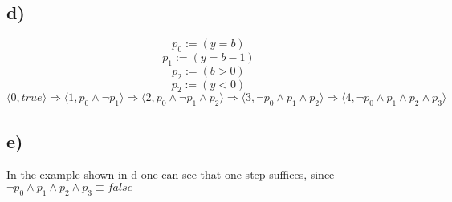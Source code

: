 \documentclass[fleqn,12pt]{article}
\begin{document}
\subsection*{d)}
$$p_0 := (y = b)$$
$$p_1 := (y = b - 1)$$
$$p_2 := (b>0)$$
$$p_2 := (y<0)$$
$$\langle 0, true \rangle \Rightarrow \langle 1, p_0 \wedge \lnot p_1 \rangle \Rightarrow \langle 2, p_0 \wedge \lnot p_1 \wedge p_2 \rangle \Rightarrow \langle 3, \lnot p_0 \wedge p_1 \wedge p_2 \rangle \Rightarrow \langle 4, \lnot p_0 \wedge p_1 \wedge p_2 \wedge p_3 \rangle$$
\subsection*{e)}
In the example shown in d one can see that one step suffices, since $ \lnot p_0 \wedge p_1 \wedge p_2 \wedge p_3 \equiv false$ 
\end{document}
